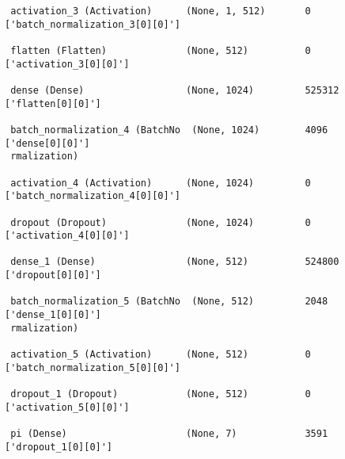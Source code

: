 \documentclass[12pt]{article}
\begin{document}
\begin{redenum}
\begin{itemize}
\begin{itemize}
\begin{center}
\begin{BVerbatim}
 activation_3 (Activation)      (None, 1, 512)       0           ['batch_normalization_3[0][0]']  
                                                                                                  
 flatten (Flatten)              (None, 512)          0           ['activation_3[0][0]']           
                                                                                                  
 dense (Dense)                  (None, 1024)         525312      ['flatten[0][0]']                
                                                                                                  
 batch_normalization_4 (BatchNo  (None, 1024)        4096        ['dense[0][0]']                  
 rmalization)                                                                                     
                                                                                                  
 activation_4 (Activation)      (None, 1024)         0           ['batch_normalization_4[0][0]']  
                                                                                                  
 dropout (Dropout)              (None, 1024)         0           ['activation_4[0][0]']           
                                                                                                  
 dense_1 (Dense)                (None, 512)          524800      ['dropout[0][0]']                
                                                                                                  
 batch_normalization_5 (BatchNo  (None, 512)         2048        ['dense_1[0][0]']                
 rmalization)                                                                                     
                                                                                                  
 activation_5 (Activation)      (None, 512)          0           ['batch_normalization_5[0][0]']  
                                                                                                  
 dropout_1 (Dropout)            (None, 512)          0           ['activation_5[0][0]']           
                                                                                                  
 pi (Dense)                     (None, 7)            3591        ['dropout_1[0][0]']              
                                                                                                  

\end{BVerbatim}
\end{center}
\end{itemize}
\end{itemize}
\end{redenum}
\end{document}
